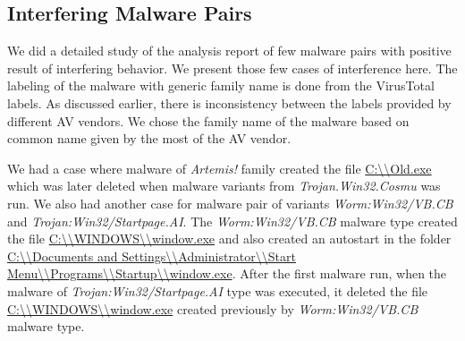 \subsection{Interfering Malware Pairs}
\label{sub:Interfering Malware Pairs}
We did a detailed study of the analysis report of few malware pairs with positive result of interfering behavior.
We present those few cases of interference here.
The labeling of the malware with generic family name is done from the VirusTotal labels.
As discussed earlier, there is inconsistency between the labels provided by different AV vendors.
We chose the family name of the malware based on common name given by the most of the AV vendor.

We had a case where malware of \emph{Artemis!} family created the file \url{C:\\Old.exe} which was later deleted when malware variants from \emph{Trojan.Win32.Cosmu} was run.
We also had another case for malware pair of variants \emph{Worm:Win32/VB.CB} and \emph{Trojan:Win32/Startpage.AI}.
The \emph{Worm:Win32/VB.CB} malware type created the file \url{C:\\WINDOWS\\window.exe} and also created an autostart in the folder \url{C:\\Documents and Settings\\Administrator\\Start Menu\\Programs\\Startup\\window.exe}.
After the first malware run, when the malware of \emph{Trojan:Win32/Startpage.AI} type was executed, it deleted the file \url{C:\\WINDOWS\\window.exe} created previously by \emph{Worm:Win32/VB.CB} malware type.

